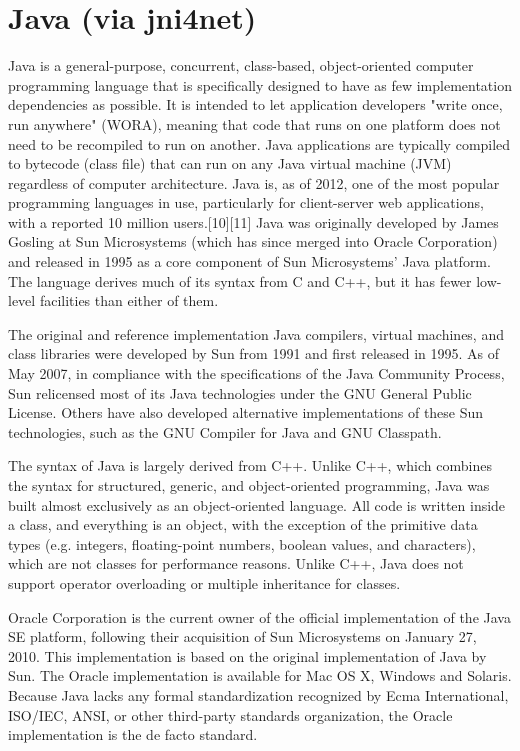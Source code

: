 \newpage
\section{Java (via jni4net)}
Java is a general-purpose, concurrent, class-based, object-oriented computer programming language that is specifically designed to have as few implementation dependencies as possible. It is intended to let application developers "write once, run anywhere" (WORA), meaning that code that runs on one platform does not need to be recompiled to run on another. Java applications are typically compiled to bytecode (class file) that can run on any Java virtual machine (JVM) regardless of computer architecture. Java is, as of 2012, one of the most popular programming languages in use, particularly for client-server web applications, with a reported 10 million users.[10][11] Java was originally developed by James Gosling at Sun Microsystems (which has since merged into Oracle Corporation) and released in 1995 as a core component of Sun Microsystems' Java platform. The language derives much of its syntax from C and C++, but it has fewer low-level facilities than either of them.

\vpara
The original and reference implementation Java compilers, virtual machines, and class libraries were developed by Sun from 1991 and first released in 1995. As of May 2007, in compliance with the specifications of the Java Community Process, Sun relicensed most of its Java technologies under the GNU General Public License. Others have also developed alternative implementations of these Sun technologies, such as the GNU Compiler for Java and GNU Classpath.

\vpara
The syntax of Java is largely derived from C++. Unlike C++, which combines the syntax for structured, generic, and object-oriented programming, Java was built almost exclusively as an object-oriented language. All code is written inside a class, and everything is an object, with the exception of the primitive data types (e.g. integers, floating-point numbers, boolean values, and characters), which are not classes for performance reasons. Unlike C++, Java does not support operator overloading or multiple inheritance for classes. 

\vpara
Oracle Corporation is the current owner of the official implementation of the Java SE platform, following their acquisition of Sun Microsystems on January 27, 2010. This implementation is based on the original implementation of Java by Sun. The Oracle implementation is available for Mac OS X, Windows and Solaris. Because Java lacks any formal standardization recognized by Ecma International, ISO/IEC, ANSI, or other third-party standards organization, the Oracle implementation is the de facto standard.

